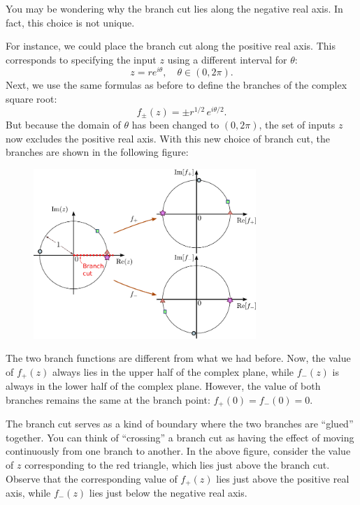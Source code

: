 \documentclass[10pt,a4paper]{article}
\begin{document}
You may be wondering why the branch cut lies along the negative real
axis. In fact, this choice is not unique.

For instance, we could place the branch cut along the positive real
axis. This corresponds to specifying the input $z$ using a different
interval for $\theta$:
\begin{equation}
  z = re^{i\theta}, \quad \theta \in (0, 2\pi).
\end{equation}
Next, we use the same formulas as before to define the branches of the
complex square root:
\begin{equation}
  f_\pm(z) = \pm r^{1/2} \, e^{i\theta/2}.
\end{equation}
But because the domain of $\theta$ has been changed to $(0, 2\pi)$,
the set of inputs $z$ now excludes the positive real axis. With this
new choice of branch cut, the branches are shown in the following
figure:

\begin{figure}[h]
  \centering\includegraphics[width=0.75\textwidth]{complex_root_2}
\end{figure}

The two branch functions are different from what we had before. Now,
the value of $f_+(z)$ always lies in the upper half of the complex
plane, while $f_-(z)$ is always in the lower half of the complex
plane. However, the value of both branches remains the same at the
branch point: $f_+(0) = f_-(0) = 0$.

The branch cut serves as a kind of boundary where the two branches are
``glued'' together. You can think of ``crossing'' a branch cut as
having the effect of moving continuously from one branch to
another. In the above figure, consider the value of $z$ corresponding
to the red triangle, which lies just above the branch cut. Observe
that the corresponding value of $f_+(z)$ lies just above the positive
real axis, while $f_-(z)$ lies just below the negative real
axis.
\end{document}
